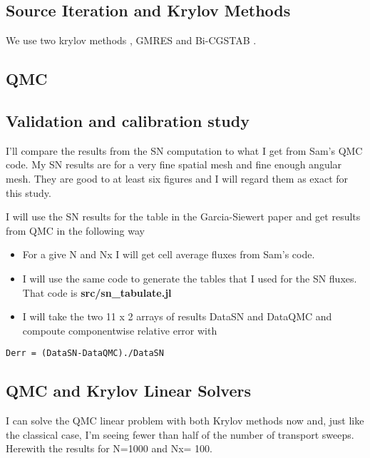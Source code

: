 \subsection{Source Iteration and Krylov Methods}
\label{source-iteration-and-krylov-methods}

We use two krylov methods \cite{ctk:roots}, GMRES \cite{gmres} and
Bi-CGSTAB \cite{bicgstab}.

\subsection{QMC}\label{qmc}

\subsection{Validation and calibration study}
\label{validation-and-calibration-study}

I'll compare the results from the SN computation to what I get from
Sam's QMC code. My SN results are for a very fine spatial mesh and fine
enough angular mesh. They are good to at least six figures and I will
regard them as exact for this study.

I will use the SN results for the table in the Garcia-Siewert paper and
get results from QMC in the following way

\begin{itemize}
\item
  For a give N and Nx I will get cell average fluxes from Sam's code.
\item
  I will use the same code to generate the tables that I used for the SN
  fluxes. That code is \textbf{src/sn\_tabulate.jl}
\item
  I will take the two 11 x 2 arrays of results DataSN and DataQMC and
  compoute componentwise relative error with
\end{itemize}

\begin{verbatim}
Derr = (DataSN-DataQMC)./DataSN
\end{verbatim}

\subsection{QMC and Krylov Linear Solvers}
\label{qmc-and-krylov-linear-solvers}

I can solve the QMC linear problem with both Krylov methods now and,
just like the classical case, I'm seeing fewer than half of the number
of transport sweeps. Herewith the results for N=1000 and Nx= 100.





